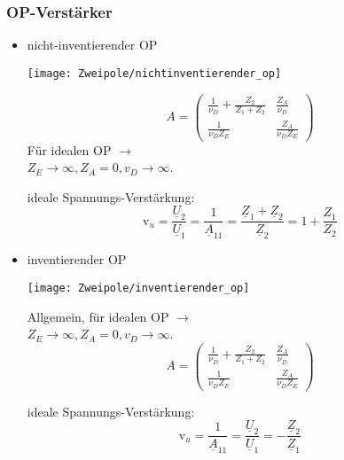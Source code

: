 \subsubsection{OP-Verstärker}
\begin{itemize}[leftmargin=*]
	\item nicht-inventierender OP\\
			\begin{minipage}{0.4\columnwidth}
				\texttt{[image: Zweipole/nichtinventierender\_op]}
			\end{minipage}
			\begin{minipage}{0.6\columnwidth}
				\begin{equation*}
					A = \begin{pmatrix}
						\frac{1}{\nu_D} + \frac{Z_2}{Z_1 + Z_2} & \frac{Z_A}{\nu_D} \\
						\frac{1}{\nu_D Z_E} & \frac{Z_A}{\nu_D Z_E}
					\end{pmatrix}
				\end{equation*}
			Für idealen OP $\rightarrow$ \\
			$Z_E\rightarrow\infty, Z_A=0, v_D\rightarrow\infty$.
			\vspace{1.1em}
			\end{minipage}
			ideale Spannungs-Verstärkung:
			\begin{equation*}
				\text{v}_u=\frac{\underline{U}_2}{\underline{U}_1}=
				\frac{1}{\underline{A}_{11}}=\frac{\underline{Z}_1+\underline{Z}_2}{\underline{Z}_2} = 1 + \frac{Z_1}{Z_2}
			\end{equation*}
	\item inventierender OP\\
	\begin{minipage}{0.4\columnwidth}
		\texttt{[image: Zweipole/inventierender\_op]}
	\end{minipage}
	\begin{minipage}{0.6\columnwidth}
		Allgemein, für idealen OP $\rightarrow$ \\
		$Z_E\rightarrow\infty, Z_A=0, v_D\rightarrow\infty$.
		\begin{equation*}
			A = \begin{pmatrix}
				\frac{1}{\nu_D} + \frac{Z_2}{Z_1 + Z_2} & \frac{Z_A}{\nu_D} \\
				\frac{1}{\nu_D Z_E} & \frac{Z_A}{\nu_D Z_E}
			\end{pmatrix}
		\end{equation*}
			\vspace{1em}
	\end{minipage}
			ideale Spannungs-Verstärkung:
	\begin{equation*}
		\text{v}_u=\frac{1}{\underline{A}_{11}}=\frac{\underline{U}_2}{\underline{U}_1}=-\frac{\underline{Z}_2}{\underline{Z}_1}
	\end{equation*}
\end{itemize}

